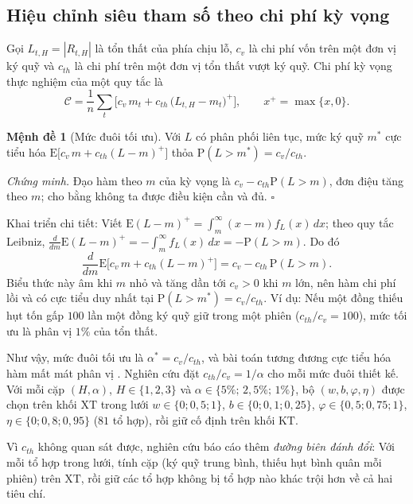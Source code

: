\documentclass[12pt,a4paper]{article}
\theoremstyle{definition}
\newtheorem{menhde}{Mệnh đề}[section]
\theoremstyle{remark}
\newcommand{\E}{\mathrm{E}}
\newcommand{\Prob}{\mathrm{P}}
\newcommand{\XT}{\mathrm{XT}}
\newcommand{\KT}{\mathrm{KT}}
\begin{document}
\subsection{Hiệu chỉnh siêu tham số theo chi phí kỳ vọng}

Gọi $L_{t,H}=|R_{t,H}|$ là tổn thất của phía chịu lỗ, $c_v$ là chi phí vốn trên một đơn vị ký quỹ và $c_{th}$ là chi phí trên một đơn vị tổn thất vượt ký quỹ. Chi phí kỳ vọng thực nghiệm của một quy tắc là
\begin{equation}
\mathcal C=\frac1n\sum_{t}\Big[c_v\,m_t+c_{th}\,\big(L_{t,H}-m_t\big)^{+}\Big],\qquad x^{+}=\max\{x,0\}.
\end{equation}

\begin{menhde}[Mức đuôi tối ưu]
Với $L$ có phân phối liên tục, mức ký quỹ $m^{*}$ cực tiểu hóa $\E\big[c_v\,m+c_{th}(L-m)^{+}\big]$ thỏa $\Prob(L>m^{*})=c_v/c_{th}$.
\end{menhde}
\noindent\textit{Chứng minh.} Đạo hàm theo $m$ của kỳ vọng là $c_v-c_{th}\Prob(L>m)$, đơn điệu tăng theo $m$; cho bằng không ta được điều kiện cần và đủ. \hfill$\square$

Khai triển chi tiết: Viết $\E(L-m)^{+}=\int_m^{\infty}(x-m)f_L(x)\,dx$; theo quy tắc Leibniz, $\frac{d}{dm}\E(L-m)^{+}=-\int_m^{\infty}f_L(x)\,dx=-\Prob(L>m)$. Do đó
\begin{equation*}
\frac{d}{dm}\E\big[c_v\,m+c_{th}(L-m)^{+}\big]=c_v-c_{th}\,\Prob(L>m).
\end{equation*}
Biểu thức này âm khi $m$ nhỏ và tăng dần tới $c_v>0$ khi $m$ lớn, nên hàm chi phí lồi và có cực tiểu duy nhất tại $\Prob(L>m^{*})=c_v/c_{th}$. Ví dụ: Nếu một đồng thiếu hụt tốn gấp $100$ lần một đồng ký quỹ giữ trong một phiên ($c_{th}/c_v=100$), mức tối ưu là phân vị $1\%$ của tổn thất.

Như vậy, mức đuôi tối ưu là $\alpha^{*}=c_v/c_{th}$, và bài toán tương đương cực tiểu hóa hàm mất mát phân vị \cite{koenker1978}. Nghiên cứu đặt $c_{th}/c_v=1/\alpha$ cho mỗi mức đuôi thiết kế. Với mỗi cặp $(H,\alpha)$, $H\in\{1,2,3\}$ và $\alpha\in\{5\%;\,2{,}5\%;\,1\%\}$, bộ $(w,b,\varphi,\eta)$ được chọn trên khối $\XT$ trong lưới $w\in\{0;0{,}5;1\}$, $b\in\{0;0{,}1;0{,}25\}$, $\varphi\in\{0{,}5;0{,}75;1\}$, $\eta\in\{0;0{,}8;0{,}95\}$ ($81$ tổ hợp), rồi giữ cố định trên khối $\KT$.

Vì $c_{th}$ không quan sát được, nghiên cứu báo cáo thêm \emph{đường biên đánh đổi}: Với mỗi tổ hợp trong lưới, tính cặp (ký quỹ trung bình, thiếu hụt bình quân mỗi phiên) trên $\XT$, rồi giữ các tổ hợp không bị tổ hợp nào khác trội hơn về cả hai tiêu chí.
\end{document}
